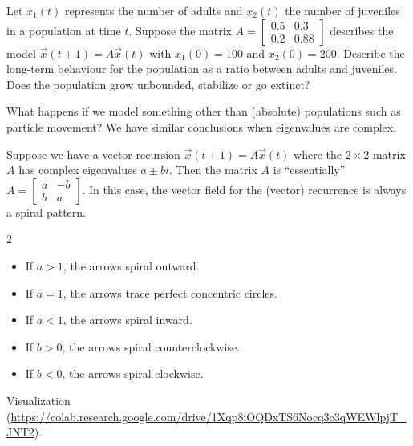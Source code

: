 \documentclass[../main.tex]{subfiles}
\begin{document}
\begin{exercise} \label{ex:perron-adults-juveniles}
  Let \(x_{1}(t)\) represents the number of adults and \(x_{2}(t)\) the number of juveniles in a population at time \(t\). Suppose the matrix \(A = \begin{bmatrix} 0.5 & 0.3 \\ 0.2 & 0.88 \end{bmatrix}\) describes the model \(\vec{x}(t+1) = A \vec{x}(t)\) with \(x_{1}(0) = 100\) and \(x_{2}(0) = 200\). Describe the long-term behaviour for the population as a ratio between adults and juveniles. Does the population grow unbounded, stabilize or go extinct?  
  
  \blanks*
\end{exercise}
\clearpage

What happens if we model  something other than (absolute) populations such as particle movement?  We have similar  conclusions when eigenvalues are complex.

\faStar{} Suppose we have a vector recursion \(\vec{x}(t+1) = A\vec{x}(t)\)  where the \(2 \times 2\) matrix \(A\) has complex eigenvalues \(a \pm bi\).  Then the matrix \(A\) is ``essentially'' 
\(A = \begin{bmatrix} a & -b\\ b & a \end{bmatrix} \).
In this case, the vector field for the (vector) recurrence is always a spiral pattern.
\begin{multicols}{2}
  \begin{itemize}
    \item If \(a > 1\), the arrows spiral outward. 
    \item If \(a = 1\), the arrows trace perfect concentric circles.
    \item If \(a < 1\), the arrows spiral inward.
      \columnbreak
    \item If \(b > 0\), the arrows spiral counterclockwise.
    \item If \(b < 0\), the arrows spiral clockwise.
  \end{itemize}
\end{multicols}

Visualization (\url{https://colab.research.google.com/drive/1Xqp8iOQDxTS6Nocq3c3qWEWlpjT_JNT2}).
\end{document}
